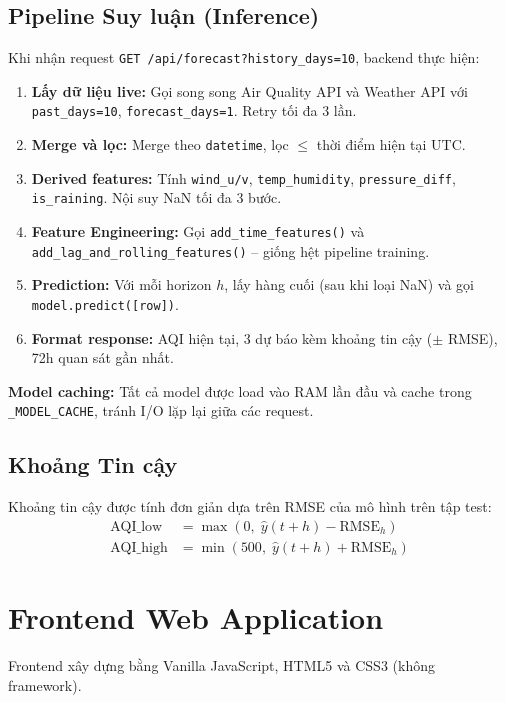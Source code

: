 \documentclass[12pt,a4paper]{report}
\begin{document}
\subsection{Pipeline Suy luận (Inference)}

Khi nhận request \texttt{GET /api/forecast?history\_days=10}, backend thực hiện:

\begin{enumerate}
  \item \textbf{Lấy dữ liệu live:} Gọi song song Air Quality API và Weather API với \texttt{past\_days=10}, \texttt{forecast\_days=1}. Retry tối đa 3 lần.
  \item \textbf{Merge và lọc:} Merge theo \texttt{datetime}, lọc $\leq$ thời điểm hiện tại UTC.
  \item \textbf{Derived features:} Tính \texttt{wind\_u/v}, \texttt{temp\_humidity}, \texttt{pressure\_diff}, \texttt{is\_raining}. Nội suy NaN tối đa 3 bước.
  \item \textbf{Feature Engineering:} Gọi \texttt{add\_time\_features()} và \texttt{add\_lag\_and\_rolling\_features()} -- giống hệt pipeline training.
  \item \textbf{Prediction:} Với mỗi horizon $h$, lấy hàng cuối (sau khi loại NaN) và gọi \texttt{model.predict([row])}.
  \item \textbf{Format response:} AQI hiện tại, 3 dự báo kèm khoảng tin cậy ($\pm$ RMSE), 72h quan sát gần nhất.
\end{enumerate}

\textbf{Model caching:} Tất cả model được load vào RAM lần đầu và cache trong \texttt{\_MODEL\_CACHE}, tránh I/O lặp lại giữa các request.

\subsection{Khoảng Tin cậy}

Khoảng tin cậy được tính đơn giản dựa trên RMSE của mô hình trên tập test:
\begin{align}
  \text{AQI\_low}  &= \max(0,\; \hat{y}(t+h) - \text{RMSE}_h) \\
  \text{AQI\_high} &= \min(500,\; \hat{y}(t+h) + \text{RMSE}_h)
\end{align}

\section{Frontend Web Application}

Frontend xây dựng bằng Vanilla JavaScript, HTML5 và CSS3 (không framework).
\end{document}
